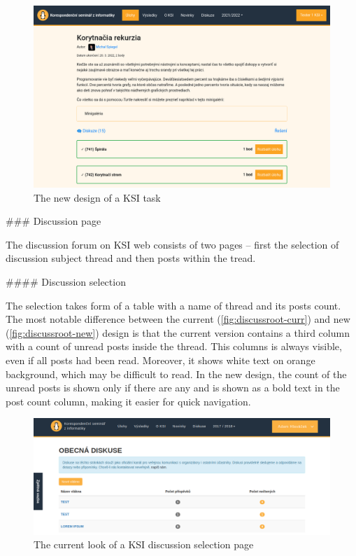 \documentclass[
  digital, %
  oneside, %
  lof,     %
  nolot,     %
]{fithesis4}
\begin{document}
{\begin{figure}
\includegraphics[width=\textwidth]{assets/img/task-new}
\caption{The new design of a KSI task}
\label{fig:task-new}
\end{figure}


### Discussion page

The discussion forum on KSI web consists of two pages -- first the selection of discussion subject thread and then posts within the tread.

#### Discussion selection

The selection takes form of a table with a name of thread and its posts count. The most notable difference between the current (\autoref{fig:discussroot-curr}) and new (\autoref{fig:discussroot-new}) design is that the current version contains a third column with a count of unread posts inside the thread. This columns is always visible, even if all posts had been read. Moreover, it shows white text on orange background, which may be difficult to read. In the new design, the count of the unread posts is shown only if there are any and is shown as a bold text in the post count column, making it easier for quick navigation.

\begin{figure}
\includegraphics[width=\textwidth]{assets/img/discussionroot-curr}
\caption{The current look of a KSI discussion selection page}
\label{fig:discussroot-curr}
\end{figure}

}
\end{document}
